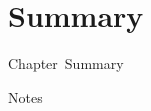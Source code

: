 \documentclass[10pt]{beamer}
\def\mylabel{Chapter}
\def\mydeckno{1}
\def\mydeck{\mylabel\space\mydeckno}
\begin{document}

\section*{Summary}

\begin{frame}[shrink=10]{\mydeck\ Summary}
    \tableofcontents[subsectionstyle=hide/hide/hide]
\end{frame}

\begin{frame}{Notes} 
\end{frame}

\end{document}
